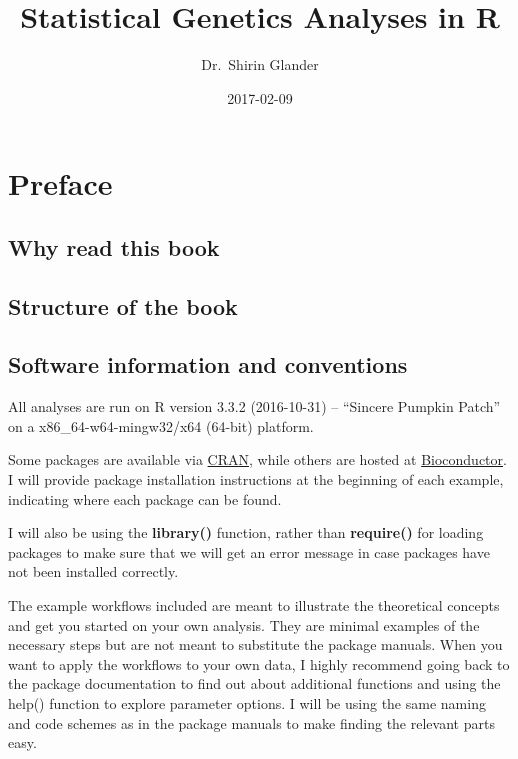 \documentclass[12pt,]{book}
\title{Statistical Genetics Analyses in R}
\author{Dr.~Shirin Glander}
\date{2017-02-09}
\theoremstyle{definition}
\theoremstyle{definition}
\theoremstyle{remark}
\begin{document}
\maketitle

{
\hypersetup{linkcolor=black}
\setcounter{tocdepth}{1}
\tableofcontents
}

\chapter*{Preface}\label{preface}

\section*{Why read this book}\label{why-read-this-book}

\section*{Structure of the book}\label{structure-of-the-book}

\section*{Software information and
	conventions}\label{software-information-and-conventions}

All analyses are run on R version 3.3.2 (2016-10-31) -- ``Sincere
Pumpkin Patch'' on a x86\_64-w64-mingw32/x64 (64-bit) platform.

Some packages are available via
\href{https://cran.r-project.org/}{CRAN}, while others are hosted at
\href{https://www.bioconductor.org/}{Bioconductor}. I will provide
package installation instructions at the beginning of each example,
indicating where each package can be found.

I will also be using the \textbf{library()} function, rather than
\textbf{require()} for loading packages to make sure that we will get an
error message in case packages have not been installed correctly.

The example workflows included are meant to illustrate the theoretical
concepts and get you started on your own analysis. They are minimal
examples of the necessary steps but are not meant to substitute the
package manuals. When you want to apply the workflows to your own data,
I highly recommend going back to the package documentation to find out
about additional functions and using the help() function to explore
parameter options. I will be using the same naming and code schemes as
in the package manuals to make finding the relevant parts easy.
\end{document}

